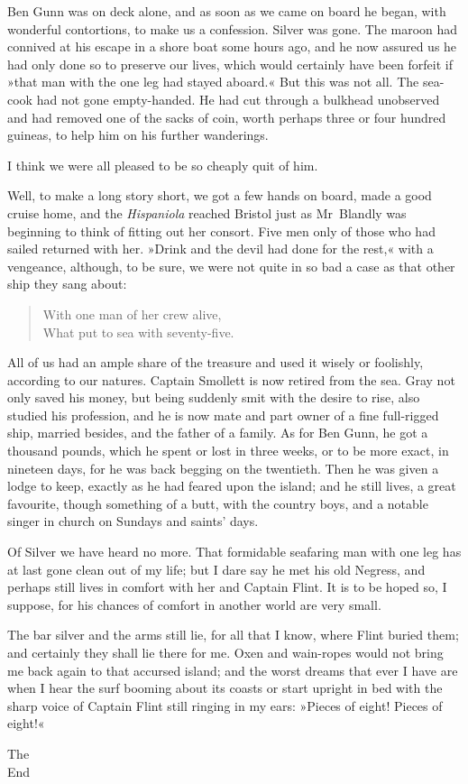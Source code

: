 Ben Gunn was on deck alone, and as soon as we came on board he began, with wonderful contortions, to make us a confession. Silver was gone. The maroon had connived at his escape in a shore boat some hours ago, and he now assured us he had only done so to preserve our lives, which would certainly have been forfeit if »that man with the one leg had stayed aboard.« But this was not all. The sea-cook had not gone empty-handed. He had cut through a bulkhead unobserved and had removed one of the sacks of coin, worth perhaps three or four hundred guineas, to help him on his further wanderings.

I think we were all pleased to be so cheaply quit of him.

Well, to make a long story short, we got a few hands on board, made a good cruise home, and the \textit{Hispaniola} reached Bristol just as Mr~Blandly was beginning to think of fitting out her consort. Five men only of those who had sailed returned with her. »Drink and the devil had done for the rest,« with a vengeance, although, to be sure, we were not quite in so bad a case as that other ship they sang about:

\blockquote{
With one man of her crew alive,\\
What put to sea with seventy-five.
}

All of us had an ample share of the treasure and used it wisely or foolishly, according to our natures. Captain Smollett is now retired from the sea. Gray not only saved his money, but being suddenly smit with the desire to rise, also studied his profession, and he is now mate and part owner of a fine full-rigged ship, married besides, and the father of a family. As for Ben Gunn, he got a thousand pounds, which he spent or lost in three weeks, or to be more exact, in nineteen days, for he was back begging on the twentieth. Then he was given a lodge to keep, exactly as he had feared upon the island; and he still lives, a great favourite, though something of a butt, with the country boys, and a notable singer in church on Sundays and saints' days.

Of Silver we have heard no more. That formidable seafaring man with one leg has at last gone clean out of my life; but I dare say he met his old Negress, and perhaps still lives in comfort with her and Captain Flint. It is to be hoped so, I suppose, for his chances of comfort in another world are very small.

The bar silver and the arms still lie, for all that I know, where Flint buried them; and certainly they shall lie there for me. Oxen and wain-ropes would not bring me back again to that accursed island; and the worst dreams that ever I have are when I hear the surf booming about its coasts or start upright in bed with the sharp voice of Captain Flint still ringing in my ears: »Pieces of eight! Pieces of eight!«
\begin{center}
{\HUGE\chapterfont The\\}
\vspace{0.5cm}
{\HUGE\chapterfont End}
\end{center}

